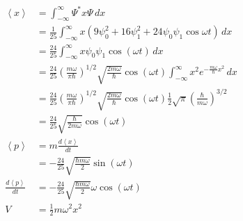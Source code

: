 \documentclass{article}
\newcommand{\ev}[1]{\left< #1 \right>}
\begin{document}
\begin{enumerate}
        \begin{align*}
          \ev{x}                              & = \int_{-\infty}^\infty \Psi^* x \Psi \,d x                                                                                                                                            \\
                                              & = \frac{1}{25} \int_{-\infty}^\infty x (9 \psi_0^2 + 16 \psi_1^2 + 24 \psi_0 \psi_1 \cos \omega t) \,d x                                                                               \\
                                              & = \frac{24}{25} \int_{-\infty}^\infty x \psi_0 \psi_1 \cos (\omega t) \,d x                                                                                                            \\
                                              & = \frac{24}{25} \left( \frac{m \omega}{\pi \hbar} \right)^{1 / 2} \sqrt{\frac{2 m \omega}{\hbar}} \cos (\omega t) \int_{-\infty}^\infty x^2 e^{-\frac{m \omega}{\hbar} x^2} \,d x      \\
                                              & = \frac{24}{25} \left( \frac{m \omega}{\pi \hbar} \right)^{1 / 2} \sqrt{\frac{2 m \omega}{\hbar}} \cos (\omega t) \frac{1}{2} \sqrt{\pi} \left( \frac{\hbar}{m \omega} \right)^{3 / 2} \\
                                              & = \frac{24}{25} \sqrt{\frac{\hbar}{2 m \omega}} \cos (\omega t)                                                                                                                        \\
          \ev{p}                              & = m \frac{d \ev{x}}{d t}                                                                                                                                                               \\
                                              & = -\frac{24}{25} \sqrt{\frac{\hbar m \omega}{2}} \sin (\omega t)                                                                                                                       \\
          \frac{d \ev{p}}{d t}                & = -\frac{24}{25} \sqrt{\frac{\hbar m \omega}{2}} \omega \cos (\omega t)                                                                                                                \\
          V                                   & = \frac{1}{2} m \omega^2 x^2                                                                                                                                                           \\

\end{align*}
\end{enumerate}
\end{document}
